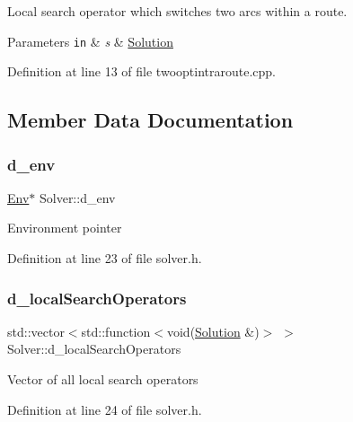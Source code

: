Local search operator which switches two arcs within a route. 


\begin{DoxyParams}[1]{Parameters}
\mbox{\tt in}  & {\em s} & \hyperlink{class_solution}{Solution} \\
\hline
\end{DoxyParams}


Definition at line 13 of file twooptintraroute.\+cpp.



\subsection{Member Data Documentation}
\mbox{\label{class_solver_a00149486de31a8a01a5eb732a8ef0dae}} 
\subsubsection{\texorpdfstring{d\+\_\+env}{d\_env}}
{\footnotesize\ttfamily \hyperlink{class_env}{Env}$\ast$ Solver\+::d\+\_\+env\hspace{0.3cm}{\ttfamily [private]}}

Environment pointer 

Definition at line 23 of file solver.\+h.

\mbox{\label{class_solver_ae7a9ecebd1a5c4048c8d74f4176700b9}} 
\subsubsection{\texorpdfstring{d\+\_\+local\+Search\+Operators}{d\_localSearchOperators}}
{\footnotesize\ttfamily std\+::vector$<$std\+::function$<$void(\hyperlink{class_solution}{Solution} \&)$>$ $>$ Solver\+::d\+\_\+local\+Search\+Operators\hspace{0.3cm}{\ttfamily [private]}}

Vector of all local search operators 

Definition at line 24 of file solver.\+h.



